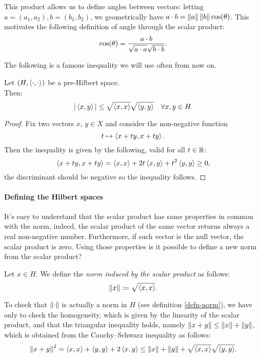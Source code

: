 This product allows us to define angles between vectors: letting $ a = (a_1, a_2), b = (b_1, b_2)$, we geometrically have $ a \cdot b = \left\lVert a\right\rVert \left\lVert b\right\rVert \cos(\theta)$. This motivates the following definition of angle through the scalar product:
$$\cos(\theta) = \frac{ a \cdot b}{\sqrt{ a \cdot a \vphantom{b}}\sqrt{ b \cdot b}}.$$

The following is a famous inequality we will use often from now on.

\begin{prop}
	\label{prop-cs-hilbert}
	Let $(H, \left\langle\cdot, \cdot\right\rangle)$ be a pre-Hilbert space.\\
	Then:
	$$ |\left\langle x, y\right\rangle| \leq \sqrt{\left\langle x, x\right\rangle}\sqrt{\left\langle y, y\right\rangle} \quad \forall x,y \in H.$$
\end{prop}

\begin{proof}
	Fix two vectors $x$, $y \in X$ and consider the non-negative function
	$$t \mapsto \left\langle x+ty, x+ty\right\rangle.$$
	Then the inequality is given by the following, valid for all $t \in \mathbb R$:
	$$\left\langle x+ ty, x+ty\right\rangle = \left\langle x, x\right\rangle + 2t \left\langle x, y\right\rangle + t^2 \left\langle y,y\right\rangle \geq 0,$$
	the discriminant should be negative so the inequality follows.
\end{proof}

\paragraph{Defining the Hilbert spaces} It's easy to understand that the scalar product has same properties in common with the norm, indeed, the scalar product of the same vector returns always a real non-negative number. Furthermore, if such vector is the null vector, the scalar product is zero. Using those properties is it possible to define a new norm from the scalar product?
\begin{defn}
	Let $x \in H$.
	We define the \emph{norm induced by the scalar product} as follows:
	$$\left\lVert x\right\rVert \coloneqq \sqrt{\left\langle x, x\right\rangle}.$$
\end{defn}
To check that $\left\lVert\cdot\right\rVert$ is actually a norm in $H$ (see definition \vref{defn-norm}), we have only to check the homogeneity, which is given by the linearity of the scalar product, and that the triangular inequality holds, namely $\left\lVert x+y\right\rVert \leq \left\lVert x\right\rVert + \left\lVert y\right\rVert$, which is obtained from the Cauchy--Schwarz inequality as follows:
$$
\left\lVert x+y\right\rVert^2
=\left\langle x,x\right\rangle +\left\langle y,y\right\rangle + 2 \left\langle x,y\right\rangle
\leq \left\lVert x\right\rVert + \left\lVert y\right\rVert  + \sqrt{\left\langle x,x\right\rangle }\sqrt{\left\langle y,y\right\rangle }
.
$$

